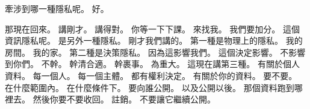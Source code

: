 \hypertarget{c01:cue:782}{}牽涉到哪一種隱私呢。
\hypertarget{c01:cue:783}{}好。

\hypertarget{c01:cue:784}{}那現在回來。
\hypertarget{c01:cue:785}{}講剛才。
\hypertarget{c01:cue:786}{}講得對。
\hypertarget{c01:cue:787}{}你等一下下課。
\hypertarget{c01:cue:788}{}來找我。
\hypertarget{c01:cue:789}{}我們要加分。
\hypertarget{c01:cue:790}{}這個資訊隱私呢。
\hypertarget{c01:cue:791}{}是另外一種隱私。
\hypertarget{c01:cue:792}{}剛才我們講的。
\hypertarget{c01:cue:793}{}第一種是物理上的隱私。
\hypertarget{c01:cue:794}{}我的房間。
\hypertarget{c01:cue:795}{}我的家。
\hypertarget{c01:cue:796}{}第二種是決策隱私。
\hypertarget{c01:cue:797}{}因為這影響我們。
\hypertarget{c01:cue:798}{}這個決定影響。
\hypertarget{c01:cue:799}{}不影響到你們。
\hypertarget{c01:cue:800}{}不幹。
\hypertarget{c01:cue:801}{}幹清合適。
\hypertarget{c01:cue:802}{}幹裹事。
\hypertarget{c01:cue:803}{}為重大。
\hypertarget{c01:cue:804}{}這現在講第三種。
\hypertarget{c01:cue:805}{}有關於個人資料。
\hypertarget{c01:cue:806}{}每一個人。
\hypertarget{c01:cue:807}{}每一個主體。
\hypertarget{c01:cue:808}{}都有權利決定。
\hypertarget{c01:cue:809}{}有關於你的資料。
\hypertarget{c01:cue:810}{}要不要。
\hypertarget{c01:cue:811}{}在什麼範圍內。
\hypertarget{c01:cue:812}{}在什麼條件下。
\hypertarget{c01:cue:813}{}要向誰公開。
\hypertarget{c01:cue:814}{}以及公開以後。
\hypertarget{c01:cue:815}{}那個資料跑到哪裡去。
\hypertarget{c01:cue:816}{}然後你要不要收回。
\hypertarget{c01:cue:817}{}註銷。
\hypertarget{c01:cue:818}{}不要讓它繼續公開。
